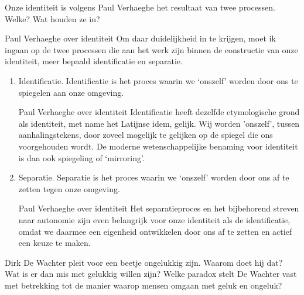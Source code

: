 \documentclass[main.tex]{subfiles}
\begin{document}
\begin{examenvraag}
    \begin{vraag}
        Onze identiteit is volgens Paul Verhaeghe het resultaat van twee processen. Welke? Wat houden ze in?
    \end{vraag}

    \begin{antwoord}
        \begin{citaat}{Paul Verhaeghe over identiteit}
            Om daar duidelijkheid in te krijgen, moet ik ingaan op de twee processen die aan het werk zijn binnen de constructie van onze identiteit, meer bepaald identificatie en separatie.
        \end{citaat}
        \begin{enumerate}
            \item Identificatie.
                Identificatie is het proces waarin we `onszelf' worden door ons te spiegelen aan onze omgeving.
                \begin{citaat}{Paul Verhaeghe over identiteit}
                    Identificatie heeft dezelfde etymologische grond als identiteit, met name het Latijnse idem, gelijk.
                    Wij worden 'onszelf', tussen aanhalingstekens, door zoveel mogelijk te gelijken op de spiegel die ons voorgehouden wordt.
                    De moderne wetenschappelijke benaming voor identiteit is dan ook spiegeling of `mirroring'.
                \end{citaat}
            \item Separatie.
                Separatie is het proces waarin we `onszelf' worden door ons af te zetten tegen onze omgeving.
                \begin{citaat}{Paul Verhaeghe over identiteit}
                Het separatieproces en het bijbehorend streven naar autonomie zijn even belangrijk voor onze identiteit als de identificatie, omdat we daarmee een eigenheid ontwikkelen door ons af te zetten en actief een keuze te maken.
                \end{citaat}
        \end{enumerate}
    \end{antwoord}
\end{examenvraag}


\begin{examenvraag}
    \begin{vraag}
        Dirk De Wachter pleit voor een beetje ongelukkig zijn. Waarom doet hij dat? Wat is er dan mis met gelukkig willen zijn? Welke paradox stelt De Wachter vast met betrekking tot de manier waarop mensen omgaan met geluk en ongeluk?
    \end{vraag}

    \begin{antwoord}
    \end{antwoord}
\end{examenvraag}
\end{document}
